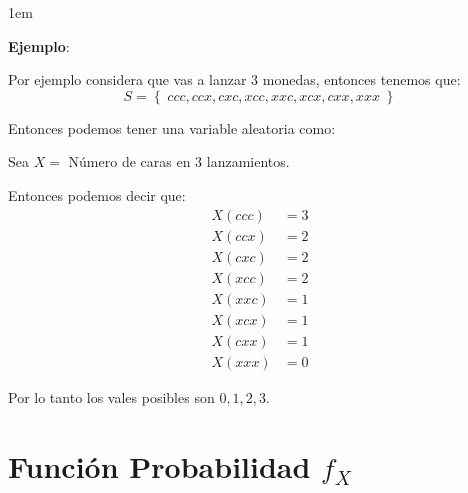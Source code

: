 \documentclass[12pt, fleqn]{report}                             %
\newenvironment{SmallIndentation}[1][0.75em]                    %
        {\begin{adjustwidth}{#1}{}\begin{footnotesize}}             %
        {\end{footnotesize}\end{adjustwidth}}                       %
\theoremstyle{break}                                            %
\newcommand{\Set}[1]{\left\{ \; #1 \; \right\}}                 %
\begin{document}
                \begin{SmallIndentation}[1em]
                    \textbf{Ejemplo}:
                    
                    Por ejemplo considera que vas a lanzar 3 monedas, entonces tenemos que:
                    \begin{equation*}
                        S = \Set{ccc, ccx, cxc, xcc, xxc, xcx, cxx, xxx}
                    \end{equation*}

                    Entonces podemos tener una variable aleatoria como:

                    Sea $X =$ Número de caras en 3 lanzamientos.

                    Entonces podemos decir que:
                    \begin{align*}
                        X(ccc) &= 3  \\
                        X(ccx) &= 2  \\
                        X(cxc) &= 2  \\
                        X(xcc) &= 2  \\
                        X(xxc) &= 1  \\
                        X(xcx) &= 1  \\
                        X(cxx) &= 1  \\
                        X(xxx) &= 0
                    \end{align*}

                    Por lo tanto los vales posibles son $0, 1, 2, 3$.

                \end{SmallIndentation}
                


        \clearpage
        \section{Función Probabilidad $f_X$}

           
\end{document}
